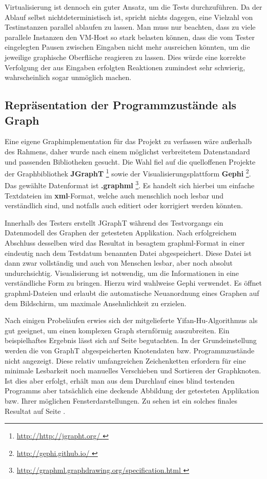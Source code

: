 Virtualisierung ist dennoch ein guter Ansatz, um die Tests
durchzuführen. Da der Ablauf selbst nichtdeterministisch ist,
spricht nichts dagegen, eine Vielzahl von Testinstanzen parallel ablaufen zu
lassen. Man muss nur beachten, dass zu viele parallele Instanzen den VM-Host
so stark belasten können, dass die vom Tester eingelegten Pausen
zwischen Eingaben nicht mehr ausreichen könnten, um die jeweilige graphische
Oberfläche reagieren zu lassen. Dies würde eine korrekte Verfolgung
der aus Eingaben erfolgten Reaktionen zumindest sehr schwierig,
wahrscheinlich sogar unmöglich machen.


\subsection{Repräsentation der Programmzustände als Graph}

Eine eigene Graphimplementation für das Projekt zu verfassen wäre
außerhalb des Rahmens, daher wurde nach einem möglichst verbreitetem
Datenstandard und passenden Bibliotheken gesucht. Die Wahl fiel auf
die quelloffenen Projekte der Graphbibliothek \textbf{JGraphT} \footnote{\url{ http://http://jgrapht.org/ }} 
sowie der Visualisierungsplattform \textbf{Gephi} \footnote{\url{ http://gephi.github.io/ }}.
Das gewählte Datenformat ist \textbf{.graphml} \footnote{\url{ http://graphml.graphdrawing.org/specification.html }}.
Es handelt sich hierbei um einfache Textdateien im \textbf{xml}-Format,
welche auch menschlich noch lesbar und verständlich sind, und notfalls
auch editiert oder korrigiert werden könnten. 

Innerhalb des Testers erstellt JGraphT während des Testvorgangs 
ein Datenmodell des Graphen der getesteten Applikation. Nach erfolgreichem
Abschluss desselben wird das Resultat in besagtem graphml-Format
in einer eindeutig nach dem Testdatum benannten Datei abgespeichert.
Diese Datei ist dann zwar vollständig und auch von Menschen lesbar,
aber noch absolut undurchsichtig. Visualisierung ist notwendig,
um die Informationen in eine verständliche Form zu bringen.
Hierzu wird wahlweise Gephi verwendet. Es öffnet graphml-Dateien
und erlaubt die automatische Neuanordnung eines Graphen auf dem
Bildschirm, um maximale Ansehnlichkeit zu erzielen.

Nach einigen Probeläufen erwies sich der mitgelieferte 
Yifan-Hu-Algorithmus \cite{hu2005efficient} als gut geeignet,
um einen komplexen Graph sternförmig auszubreiten. Ein beispielhaftes
Ergebnis lässt sich auf Seite \pageref{fig:model_firstspirit_notext}
begutachten. In der Grundeinstellung werden die von GraphT
abgespeicherten Knotendaten bzw. Programmzustände nicht angezeigt.
Diese relativ umfangreichen Zeichenketten erfordern für eine minimale
Lesbarkeit noch manuelles Verschieben und Sortieren der Graphknoten.
Ist dies aber erfolgt, erhält man aus dem Durchlauf eines blind testenden
Programms aber tatsächlich eine deckende Abbildung der getesteten
Applikation bzw. Ihrer möglichen Fensterdarstellungen. Zu sehen
ist ein solches finales Resultat auf Seite \pageref{fig:model_freespirit_06.10.2015}.

